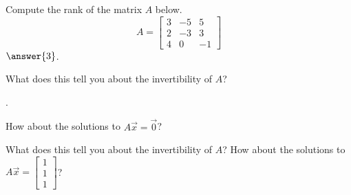 \documentclass{ximera}
\begin{document}
\begin{exercise}%
    Compute the rank of the matrix $A$ below.
    \[ A =  \begin{bmatrix} 3 & -5 & 5 \\ 2 &-3 & 3\\ 4 & 0 & -1 \end{bmatrix} \]
    $\answer{3}$.
    \begin{problem}
        What does this tell you about the invertibility of $A$? 
        \begin{multipleChoice}
            . 
        \end{multipleChoice}
        \begin{problem}
            How about the solutions to $A\vec{x} = \vec{0}$? 
            \begin{multipleChoice}
            \end{multipleChoice}
        \end{problem}
    \end{problem}
    What does this tell you about the invertibility of $A$? How about the solutions to $A\vec{x} = \begin{bmatrix} 1\\1\\1 \end{bmatrix}$? 
\end{exercise}
\end{document}
